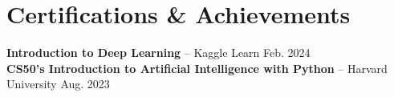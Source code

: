 \documentclass[letterpaper,11pt]{article}
\begin{document}
\section{Certifications \& Achievements}
 \begin{itemize}[leftmargin=0.15in, label={}]
    \small{\item{
     \textbf{Introduction to Deep Learning} -- Kaggle Learn \hfill Feb. 2024 \\
     \textbf{CS50’s Introduction to Artificial Intelligence with Python} -- Harvard University \hfill Aug. 2023 
    }}
 \end{itemize}
\end{document}
